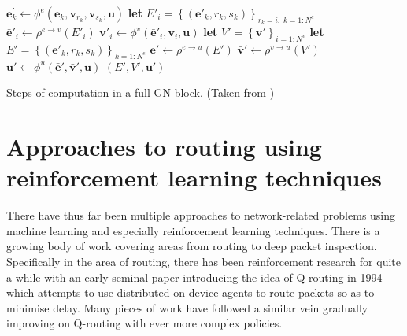 \begin{algorithm}[t]
\small
\begin{algorithmic}
        \State $\mathbf{e}_k^\prime\gets \phi^e\left(\mathbf{e}_k, \mathbf{v}_{r_k}, \mathbf{v}_{s_k}, \mathbf{u} \right)$
    \EndFor
        \State \textbf{let} $E'_i = \left\{\left(\mathbf{e}'_k, r_k, s_k \right)\right\}_{r_k=i,\; k=1:N^e}$
        \State $\mathbf{\bar{e}}'_i \gets \rho^{e \rightarrow v}\left(E'_i\right)$
        \State $\mathbf{v}'_i \gets \phi^v\left(\mathbf{\bar{e}}'_i, \mathbf{v}_i, \mathbf{u}\right)$
    \EndFor
    \State \textbf{let} $V' = \left\{\mathbf{v}'\right\}_{i=1:N^v}$
    \State \textbf{let} $E' = \left\{\left(\mathbf{e}'_k, r_k, s_k \right)\right\}_{k=1:N^e}$
    \State $\mathbf{\bar{e}}' \gets \rho^{e \rightarrow u}\left(E'\right)$
    \State $\mathbf{\bar{v}}' \gets \rho^{v \rightarrow u}\left(V'\right)$
    \State $\mathbf{u}' \gets \phi^u\left(\mathbf{\bar{e}}', \mathbf{\bar{v}}', \mathbf{u}\right)$
    \State \Return $(E', V', \mathbf{u}')$
\EndFunction
\end{algorithmic}
\caption{Steps of computation in a full GN block. (Taken from \cite{battaglia2018relational})}
\label{algorithm:graph_block}
\end{algorithm}


\section{Approaches to routing using reinforcement learning techniques}

There have thus far been multiple approaches to network-related problems using machine learning and especially reinforcement learning techniques. There is a growing body of work covering areas from routing to deep packet inspection. Specifically in the area of routing, there has been reinforcement research for quite a while with an early seminal paper introducing the idea of Q-routing in 1994\cite{boyan1994packet} which attempts to use distributed on-device agents to route packets so as to minimise delay. Many pieces of work have followed a similar vein gradually improving on Q-routing with ever more complex policies\cite{you2019toward,Ali2019HierarchicalDD}.

